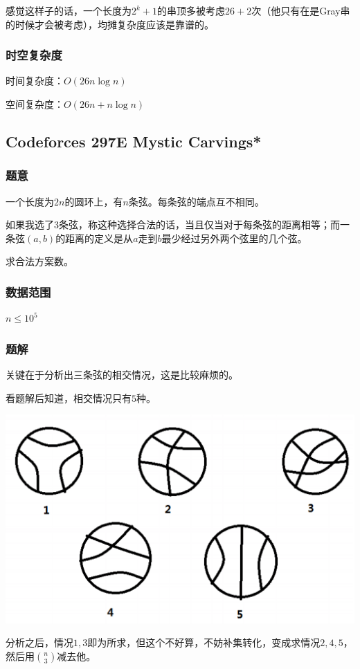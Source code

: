 \documentclass{ctexart}
\begin{document}
感觉这样子的话，一个长度为$2^k+1$的串顶多被考虑$26+2$次（他只有在是Gray串的时候才会被考虑），均摊复杂度应该是靠谱的。
\subsubsection{时空复杂度}
时间复杂度：$O(26n \log n)$

空间复杂度：$O(26n + n \log n)$
\subsection{Codeforces 297E Mystic Carvings*}
\subsubsection{题意}
一个长度为$2n$的圆环上，有$n$条弦。每条弦的端点互不相同。

如果我选了$3$条弦，称这种选择合法的话，当且仅当对于每条弦的距离相等；而一条弦$(a,b)$的距离的定义是从$a$走到$b$最少经过另外两个弦里的几个弦。

求合法方案数。
\subsubsection{数据范围}
$n \le 10^5$
\subsubsection{题解}
关键在于分析出三条弦的相交情况，这是比较麻烦的。

看题解后知道，相交情况只有$5$种。

\includegraphics{carve.png}

分析之后，情况$1,3$即为所求，但这个不好算，不妨补集转化，变成求情况$2,4,5$，然后用${n \choose 3}$减去他。
\end{document}
